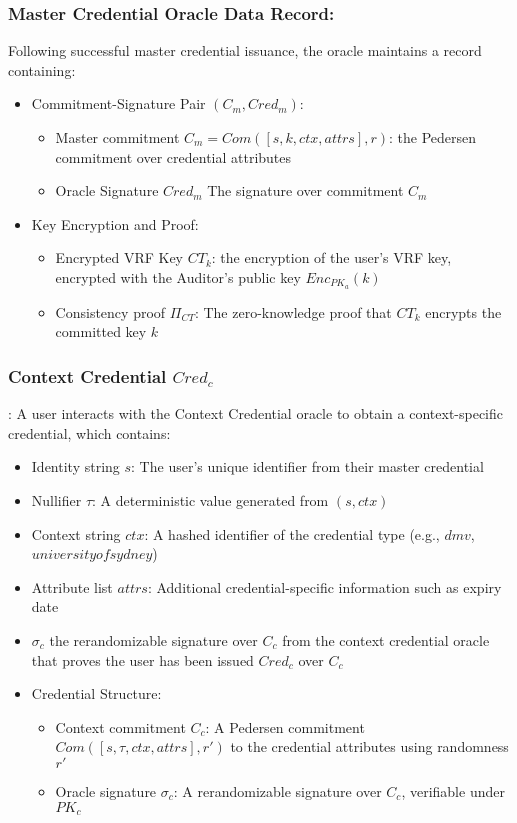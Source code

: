 \subsubsection{Master Credential Oracle Data Record:} Following successful master credential issuance, the oracle maintains a record containing:
\begin{itemize}
    \item Commitment-Signature Pair $(C_m, Cred_m)$:
    \begin{itemize}
        \item Master commitment $C_m = Com([s,k,ctx,attrs],r)$: the Pedersen commitment over credential attributes
        \item Oracle Signature $Cred_m$ The signature over commitment $C_m$
    \end{itemize}
    \item Key Encryption and Proof:
    \begin{itemize}
        \item Encrypted VRF Key $CT_k$: the encryption of the user's VRF key, encrypted with the Auditor's public key $Enc_{PK_a}(k)$
        \item Consistency proof $\Pi_{CT}$: The zero-knowledge proof that $CT_k$ encrypts the committed key $k$
    \end{itemize}
\end{itemize}


\subsubsection{Context Credential $Cred_c$}: 
A user interacts with the Context Credential oracle to obtain a context-specific credential, which contains:
\begin{itemize}
    \item Identity string $s$: The user's unique identifier from their master credential
    \item Nullifier $\tau$: A deterministic value generated from $(s, ctx)$
    \item Context string $ctx$: A hashed identifier of the credential type (e.g., $dmv$, $universityofsydney$)
    \item Attribute list $attrs$: Additional credential-specific information such as expiry date
    \item $\sigma_c$ the rerandomizable signature over $C_c$ from the context credential oracle that proves the user has been issued $Cred_c$ over $C_c$
    \item Credential Structure:
    \begin{itemize}
        \item Context commitment $C_c$: A Pedersen commitment $Com([s, \tau, ctx, attrs],r')$ to the credential attributes using randomness $r'$
        \item Oracle signature $\sigma_c$: A rerandomizable signature over $C_c$, verifiable under $PK_c$
    \end{itemize}
    
\end{itemize}


